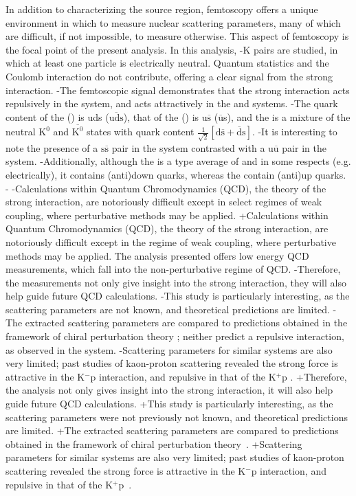  In addition to characterizing the source region, femtoscopy offers a unique environment in which to measure nuclear scattering parameters, many of which are difficult, if not impossible, to measure otherwise.  
 This aspect of femtoscopy is the focal point of the present analysis. 
 In this analysis, \Lam-K pairs are studied, in which at least one particle is electrically neutral.  
 Quantum statistics and the Coulomb interaction do not contribute, offering a clear signal from the strong interaction.
-The femtoscopic signal demonstrates that the strong interaction acts repulsively in the \LamKchP system, and acts attractively in the \LamKchM and \LamKs systems.
-The quark content of the \Lam (\ALam) is uds ($\overline{\mathrm{uds}}$), that of the \KchP (\KchM) is u$\overline{\mathrm{s}}$ ($\overline{\mathrm{u}}$s), and the \Ks is a mixture of the neutral $\mathrm{K}^{0}$ and $\overline{\mathrm{K}^{0}}$ states with quark content $\frac{1}{\sqrt{2}}\left[\mathrm{d\overline{s} + \overline{d}s}\right]$.
-It is interesting to note the presence of a $\mathrm{s\overline{s}}$ pair in the \LamKchP system contrasted with a $\mathrm{u\overline{u}}$ pair in the \LamKchM system.
-Additionally, although the \Ks is a type average of \KchP and \KchM in some respects (e.g. electrically), it contains (anti)down quarks, whereas the \Kpm contain (anti)up quarks.
-
-Calculations within Quantum Chromodynamics (QCD), the theory of the strong interaction, are notoriously difficult except in select regimes of weak coupling, where perturbative methods may be applied. 
+Calculations within Quantum Chromodynamics (QCD), the theory of the strong interaction, are notoriously difficult except in the regime of weak coupling, where perturbative methods may be applied. 
 The \LamK analysis presented offers low energy QCD measurements, which fall into the non-perturbative regime of QCD.
-Therefore, the \LamK measurements not only give insight into the strong interaction, they will also help guide future QCD calculations.
-This study is particularly interesting, as the \LamK scattering parameters are not known, and theoretical predictions are limited.
-The extracted scattering parameters are compared to predictions obtained in the framework of chiral perturbation theory \cite{Liu:2006xja,Mai:2009ce}; neither predict a repulsive interaction, as observed in the \LamKchP system.
-Scattering parameters for similar systems are also very limited; past studies of kaon-proton scattering revealed the strong force is attractive in the K$^{-}$p interaction, and repulsive in that of the K$^{+}$p \cite{Humphrey:1962zz, Hadjimichef:2002xe, Ikeda:2012au}.
+Therefore, the \LamK analysis not only gives insight into the strong interaction, it will also help guide future QCD calculations.
+This study is particularly interesting, as the \LamK scattering parameters were not previously not known, and theoretical predictions are limited.
+The extracted scattering parameters are compared to predictions obtained in the framework of chiral perturbation theory~\cite{Liu:2006xja,Mai:2009ce}.
+Scattering parameters for similar systems are also very limited; past studies of kaon-proton scattering revealed the strong force is attractive in the K$^{-}$p interaction, and repulsive in that of the K$^{+}$p~\cite{Humphrey:1962zz, Hadjimichef:2002xe, Ikeda:2012au}.
 
